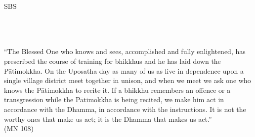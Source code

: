 \cleartorecto
\thispagestyle{empty}
\vspace*{3em}

{\centering

  \settowidth{\titleLength}{%
    {\Large\chapterTitleFont\textsc{\MakeUppercase{{\thetitle}}}}%
  }

  {\Huge\fontsize{64}{16}\sbsFont SBS}\\[1.0\baselineskip]%

  {\Huge\chapterTitleFont\textsc{{\thesubtitle\linebreak}}}\\[0.2\baselineskip]

  \\[1.4\baselineskip]

  {\Large\scshape \thetitle}\\[2.5\baselineskip]

  {\quote ``The Blessed One who knows and sees, accomplished and fully enlightened, has prescribed the course of training for bhikkhus and he has laid down the Pātimokkha. On the Uposatha day as many of us as live in dependence upon a single village district meet together in unison, and when we meet we ask one who knows the Pātimokkha to recite it. If a bhikkhu remembers an offence or a transgression while the Pātimokkha is being recited, we make him act in accordance with the Dhamma, in accordance with the instructions. It is not the worthy ones that make us act; it is the Dhamma that makes us act.''\\ \smallskip (MN 108)}\\[1.4\baselineskip]
}

